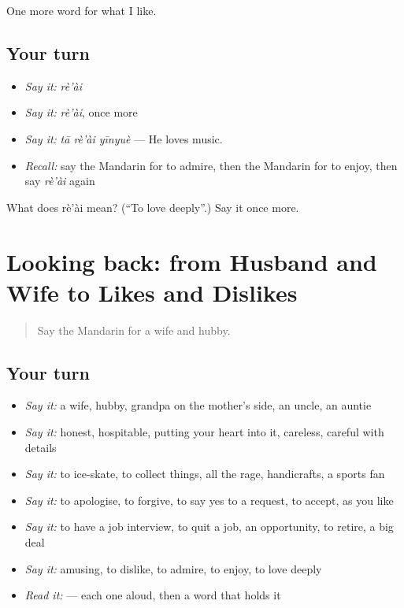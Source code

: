 \begin{grammarlens}[title={What you've built}]
One more word for what I like.
\end{grammarlens}

\subsection*{Your turn}
\begin{itemize}
\raggedright
  \item \emph{Say it:} \emph{rè'ài}
  \item \emph{Say it:} \emph{rè'ài}, once more
  \item \emph{Say it:} \emph{tā rè'ài yīnyuè} — He loves music.
  \item \emph{Recall:} say the Mandarin for to admire, then the Mandarin for to enjoy, then say \emph{rè'ài} again
\end{itemize}

\begin{tcolorbox}[breakable,colback=teal!4,colframe=teal!35!black,title={Before you move on}]
What does rè'ài mean? (\textquotedblleft{}To love deeply\textquotedblright{}.) Say it once more.
\end{tcolorbox}
\section[(dialogue)]{Looking back: from Husband and Wife to Likes and Dislikes}

\label{lesson:ZH-R277-review-272-277}



\begin{quote}
Say the Mandarin for a wife and hubby.
\end{quote}

\subsection*{Your turn}
\begin{itemize}
\raggedright
  \item \emph{Say it:} a wife, hubby, grandpa on the mother's side, an uncle, an auntie
  \item \emph{Say it:} honest, hospitable, putting your heart into it, careless, careful with details
  \item \emph{Say it:} to ice-skate, to collect things, all the rage, handicrafts, a sports fan
  \item \emph{Say it:} to apologise, to forgive, to say yes to a request, to accept, as you like
  \item \emph{Say it:} to have a job interview, to quit a job, an opportunity, to retire, a big deal
  \item \emph{Say it:} amusing, to dislike, to admire, to enjoy, to love deeply
  \item \emph{Read it:}  — each one aloud, then a word that holds it
\end{itemize}

